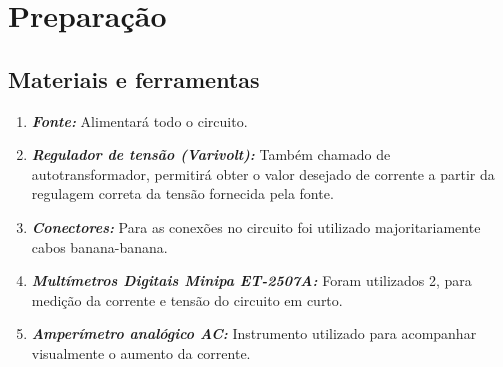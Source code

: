 \documentclass[a4paper,12pt,oneside,openany,table,xcdraw]{article}
\begin{document}
\section{Preparação}
\subsection{Materiais e ferramentas} %
\begin{enumerate}[1 -]
\item \emph{\textbf{Fonte:}}
Alimentará todo o circuito.

\item \emph{\textbf{Regulador de tensão (Varivolt):}}
Também chamado de autotransformador, permitirá obter o valor desejado de corrente a partir da regulagem correta da tensão fornecida pela fonte.

\item \emph{\textbf{Conectores:}}
Para as conexões no circuito foi utilizado majoritariamente cabos banana-banana.

\item \emph{\textbf{Multímetros Digitais Minipa ET-2507A:}}
Foram utilizados 2, para medição da corrente e tensão do circuito em curto.

\item \emph{\textbf{Amperímetro analógico AC:}}
Instrumento utilizado para acompanhar visualmente o aumento da corrente.
\end{enumerate}
\end{document}
